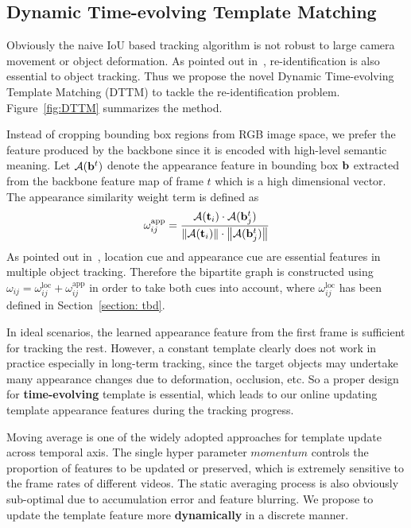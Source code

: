 \documentclass[10pt,twocolumn,letterpaper]{article}
\newcommand{\norm}[1]{\left\lVert#1\right\rVert}
\begin{document}
\subsection{Dynamic Time-evolving Template Matching}
Obviously the naive IoU based tracking algorithm is not robust to large camera movement or object deformation.
As pointed out in~\cite{bergmann2019tracking, luiten2018premvos}, re-identification is also essential to object tracking.
Thus we propose the novel Dynamic Time-evolving Template Matching (DTTM) to tackle the re-identification problem. Figure~\ref{fig:DTTM} summarizes the method.

Instead of cropping bounding box regions from RGB image space, we prefer the feature produced by the backbone since it is encoded with high-level semantic meaning. Let
$\mathcal{A}({\bf{b}}^t)$ denote the appearance feature in bounding box $\bf{b}$ extracted from the backbone feature map of frame $t$ which is a high dimensional vector. The appearance similarity weight term is defined as
\begin{equation}\label{eqn:weight-app}
{\omega^{\text{app}}_{ij}} = \frac{\mathcal{A}({\bf{t}}_i) \cdot \mathcal{A}({\bf{b}}^t_j)}{\norm{\mathcal{A}({\bf{t}}_i)} \cdot \norm{\mathcal{A}({\bf{b}}^t_j)}}
\end{equation}
As pointed out in~\cite{sadeghian2017tracking, xu2019spatial}, location cue and appearance cue are essential features in multiple object tracking.
Therefore the bipartite graph is constructed using $\omega_{ij} = \omega^{\text{loc}}_{ij} + \omega^{\text{app}}_{ij}$ in order to take both cues into account, where $\omega_{ij}^{\text{loc}}$ has been defined in Section~\ref{section: tbd}.

In ideal scenarios, the learned appearance feature from the first frame is sufficient for tracking the rest.
However, a constant template clearly does not work in practice especially in long-term tracking, since the target objects may undertake many appearance changes due to deformation, occlusion, etc.
So a proper design for \textbf{time-evolving} template is essential, which leads to our online updating template appearance features during the tracking progress.

Moving average is one of the widely adopted approaches for template update across temporal axis.
The single hyper parameter $\mathit{momentum}$ controls the proportion of features to be updated or preserved,
which is extremely sensitive to the frame rates of different videos.
The static averaging process is also obviously sub-optimal due to accumulation error and feature blurring.
We propose to update the template feature more \textbf{dynamically} in a discrete manner.
\end{document}

